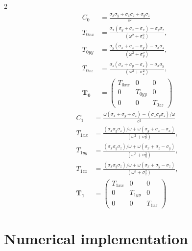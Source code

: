 \documentclass[final,num,12pt]{elsarticle}
\begin{document}
\begin{paracol}{2}
      \begin{equation*}
        \begin{aligned}
            C_0 &= \frac{\sigma_x\sigma_y + \sigma_x\sigma_z + \sigma_y\sigma_z}{c^2} \\%
            T_{0xx} &= \frac{\sigma_x(\sigma_y+\sigma_z-\sigma_x) - \sigma_y\sigma_z}{(\omega^2 + \sigma^2_x)}, \\
            T_{0yy} &= \frac{\sigma_y(\sigma_x+\sigma_z-\sigma_y)-\sigma_x\sigma_z}{(\omega^2 + \sigma^2_y)}, \\
            T_{0zz} &= \frac{\sigma_z(\sigma_x+\sigma_y-\sigma_z)-\sigma_x\sigma_y}{(\omega^2 + \sigma^2_z)}, \\
            \mathbf{T_0} &= \begin{pmatrix}
              T_{0xx} & 0 & 0 \\
             0 &  T_{0yy} & 0 \\
             0 & 0 &  T_{0zz}  
            \end{pmatrix} 
        \end{aligned}
    \end{equation*}
    \switchcolumn
       \begin{equation*}
        \begin{aligned}
            C_1 &= \frac{\omega(\sigma_x+\sigma_y+\sigma_z) - (\sigma_x\sigma_y\sigma_z)/\omega}{c^2} \\%
            T_{1xx} &= \frac{(\sigma_x\sigma_y\sigma_z)/\omega + \omega(\sigma_y+\sigma_z-\sigma_x)}{(\omega^2 + \sigma^2_x)}, \\
            T_{1yy} &= \frac{(\sigma_x\sigma_y\sigma_z)/\omega + \omega(\sigma_x+\sigma_z-\sigma_y)}{(\omega^2 + \sigma^2_y)}, \\
            T_{1zz} &= \frac{(\sigma_x\sigma_y\sigma_z)/\omega + \omega(\sigma_x+\sigma_y-\sigma_z)}{(\omega^2 + \sigma^2_z)}, \\
            \mathbf{T_1} &= \begin{pmatrix}
              T_{1xx} & 0 & 0 \\
             0 &  T_{1yy} & 0 \\
             0 & 0 &  T_{1zz}   
            \end{pmatrix} 
        \end{aligned}
    \end{equation*}
\end{paracol}
\section{Numerical implementation}
\label{sec:implementation}
\end{document}
